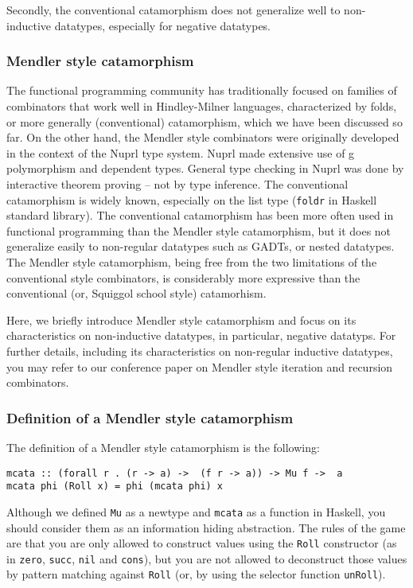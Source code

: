 Secondly, the conventional catamorphism does not generalize well to
non-inductive datatypes, especially for negative datatypes.

\subsubsection{Mendler style catamorphism}
The functional programming community has traditionally focused on families of
combinators that work well in Hindley-Milner languages, characterized by folds,
or more generally (conventional) catamorphism, which we have been discussed
so far. On the other hand, the Mendler style combinators were originally
developed in the context of the Nuprl \cite{Con86} type system. Nuprl made
extensive use of g polymorphism and dependent types. General type checking
in Nuprl was done by interactive theorem proving -- not by type inference.
The conventional catamorphism is widely known, especially on the list type
(\eg \texttt{foldr} in Haskell standard library). The conventional catamorphism
has been more often used in functional programming than the Mendler style
catamorphism, but it does not generalize easily to non-regular datatypes
such as GADTs, or nested datatypes.  The Mendler style catamorphism,
being free from the two limitations of the conventional style combinators,
is considerably more expressive than the conventional
(or, Squiggol school \cite{AoP} style) catamorhism.

Here, we briefly introduce Mendler style catamorphism and focus on its
characteristics on non-inductive datatypes, in particular, negative datatyps.
For further details, including its characteristics on non-regular
inductive datatypes, you may refer to our conference paper \cite{AhnShe11}
on Mendler style iteration and recursion combinators.

\subsubsection{Definition of a Mendler style catamorphism}
\label{sssec:mcata}
The definition of a Mendler style catamorphism is the following:
\begin{verbatim}
mcata :: (forall r . (r -> a) ->  (f r -> a)) -> Mu f ->  a
mcata phi (Roll x) = phi (mcata phi) x
\end{verbatim}
Although we defined \verb|Mu| as a newtype and \verb|mcata|
as a function in Haskell, you should consider them as an
information hiding abstraction.
The rules of the game are that you are only allowed to construct values
using the \verb|Roll| constructor (as in \verb|zero|, \verb|succ|,
\verb|nil| and \verb|cons|),
but you are not allowed to deconstruct those values by pattern matching
against \verb|Roll| (or, by using the selector function \verb|unRoll|).

